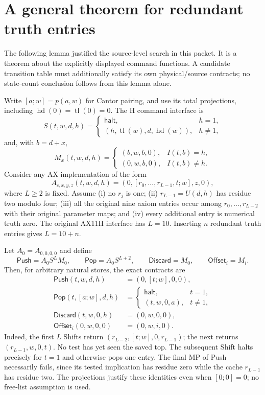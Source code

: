 \section{A general theorem for redundant truth entries}
\label{sec:truth-padding}
The following lemma justified the source-level search in this packet. It
is a theorem about the explicitly displayed command functions. A candidate
transition table must additionally satisfy its own physical/source contracts;
no state-count conclusion follows from this lemma alone.

Write $[a;w]=p(a,w)$ for Cantor pairing, and use its total projections,
including $\operatorname{hd}(0)=\operatorname{tl}(0)=0$. The H command
interface is
\[
 S(t,w,d,h)=\begin{cases}\mathsf{halt},&h=1,\\
 (h,\operatorname{tl}(w),d,\operatorname{hd}(w)),&h\ne1,
 \end{cases}
\]
and, with $b=d+x$,
\[
 M_x(t,w,d,h)=\begin{cases}(b,w,b,0),&I(t,b)=h,\\
 (0,w,b,0),&I(t,b)\ne h.
 \end{cases}
\]
Consider any AX implementation of the form
\[
 A_{c,x,y,z}(t,w,d,h)
  =(0,[r_0,\ldots,r_{L-1},t;w],z,0),                 \tag{P-A}
\]
where $L\ge2$ is fixed. Assume (i) no $r_j$ is one; (ii) $r_{L-1}=U(d,h)$
has residue two modulo four; (iii) all the original nine axiom entries
occur among $r_0,\ldots,r_{L-2}$ with their original parameter maps; and
(iv) every additional entry is numerical truth zero. The original AX11H
interface has $L=10$. Inserting $n$ redundant truth entries gives $L=10+n$.

Let $A_0=A_{0,0,0,0}$ and define
\[
 \mathsf{Push}=A_0S^L M_0,\qquad
 \mathsf{Pop}=A_0S^{L+2},\qquad
 \mathsf{Discard}=M_0,\qquad \mathsf{Offset}_i=M_i.
\]
Then, for arbitrary natural stores, the exact contracts are
\begin{align*}
 \mathsf{Push}(t,w,d,h)&=(0,[t;w],0,0),\\
 \mathsf{Pop}(t,[a;w],d,h)&=
  \begin{cases}\mathsf{halt},&t=1,\\(t,w,0,a),&t\ne1,\end{cases}\\
 \mathsf{Discard}(t,w,0,h)&=(0,w,0,0),\\
 \mathsf{Offset}_i(0,w,0,0)&=(0,w,i,0).
\end{align*}
Indeed, the first $L$ Shifts return
$(r_{L-2},[t;w],0,r_{L-1})$; the next returns
$(r_{L-1},w,0,t)$. No test has yet seen the saved top. The subsequent
Shift halts precisely for $t=1$ and otherwise pops one entry. The final
MP of Push necessarily fails, since its tested implication has residue
zero while the cache $r_{L-1}$ has residue two. The projections justify
these identities even when $[0;0]=0$; no free-list assumption is used.

